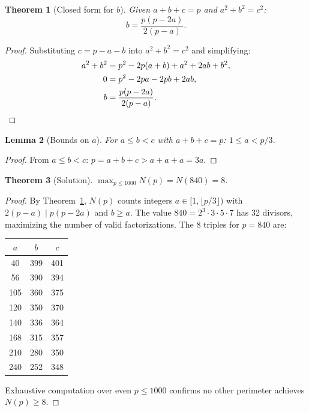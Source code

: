 \documentclass[12pt]{article}
\newtheorem{theorem}{Theorem}
\newtheorem{lemma}[theorem]{Lemma}
\theoremstyle{definition}
\begin{document}
\begin{theorem}[Closed form for $b$]
\label{thm:b}
Given $a + b + c = p$ and $a^2 + b^2 = c^2$:
\[
    b = \frac{p(p - 2a)}{2(p - a)}.
\]
\end{theorem}
\begin{proof}
Substituting $c = p - a - b$ into $a^2 + b^2 = c^2$ and simplifying:
\begin{align*}
    a^2 + b^2 &= p^2 - 2p(a+b) + a^2 + 2ab + b^2, \\
    0 &= p^2 - 2pa - 2pb + 2ab, \\
    b &= \frac{p(p-2a)}{2(p-a)}.  \qedhere
\end{align*}
\end{proof}

\begin{lemma}[Bounds on $a$]
For $a \le b < c$ with $a + b + c = p$: $1 \le a < p/3$.
\end{lemma}
\begin{proof}
From $a \le b < c$: $p = a + b + c > a + a + a = 3a$.
\end{proof}

\begin{theorem}[Solution]
\label{thm:solution}
$\displaystyle\max_{p \le 1000} N(p) = N(840) = 8$.
\end{theorem}
\begin{proof}
By Theorem~\ref{thm:b}, $N(p)$ counts integers $a \in [1, \lfloor p/3 \rfloor)$ with $2(p-a) \mid p(p-2a)$ and $b \ge a$. The value $840 = 2^3 \cdot 3 \cdot 5 \cdot 7$ has 32 divisors, maximizing the number of valid factorizations. The 8 triples for $p = 840$ are:
\begin{center}
\begin{tabular}{ccc}
\hline
$a$ & $b$ & $c$ \\
\hline
40 & 399 & 401 \\
56 & 390 & 394 \\
105 & 360 & 375 \\
120 & 350 & 370 \\
140 & 336 & 364 \\
168 & 315 & 357 \\
210 & 280 & 350 \\
240 & 252 & 348 \\
\hline
\end{tabular}
\end{center}
Exhaustive computation over even $p \le 1000$ confirms no other perimeter achieves $N(p) \ge 8$.
\end{proof}
\end{document}
